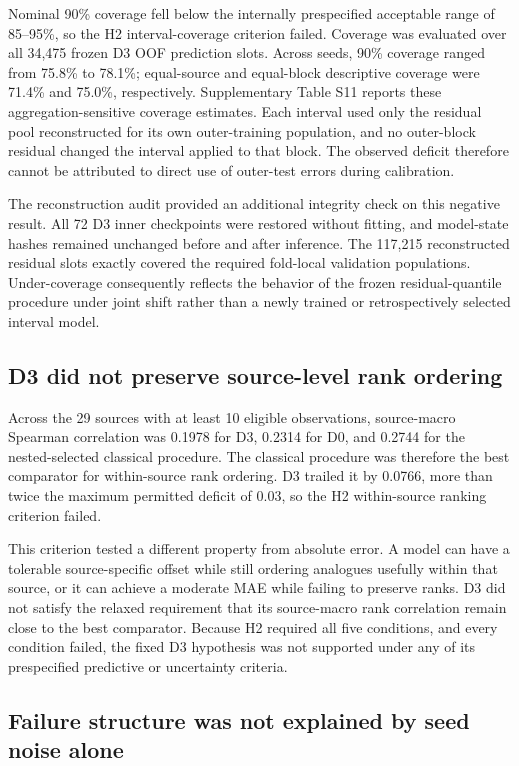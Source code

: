 \documentclass[referee,lineno,pdflatex,sn-vancouver-num]{sn-jnl}
\begin{document}
Nominal 90\% coverage fell below the internally prespecified acceptable range of 85--95\%, so the H2 interval-coverage criterion failed. Coverage was evaluated over all 34,475 frozen D3 OOF prediction slots. Across seeds, 90\% coverage ranged from 75.8\% to 78.1\%; equal-source and equal-block descriptive coverage were 71.4\% and 75.0\%, respectively. Supplementary Table S11 reports these aggregation-sensitive coverage estimates. Each interval used only the residual pool reconstructed for its own outer-training population, and no outer-block residual changed the interval applied to that block. The observed deficit therefore cannot be attributed to direct use of outer-test errors during calibration.

The reconstruction audit provided an additional integrity check on this negative result. All 72 D3 inner checkpoints were restored without fitting, and model-state hashes remained unchanged before and after inference. The 117,215 reconstructed residual slots exactly covered the required fold-local validation populations. Under-coverage consequently reflects the behavior of the frozen residual-quantile procedure under joint shift rather than a newly trained or retrospectively selected interval model.

\subsection{D3 did not preserve source-level rank ordering}

Across the 29 sources with at least 10 eligible observations, source-macro Spearman correlation was 0.1978 for D3, 0.2314 for D0, and 0.2744 for the nested-selected classical procedure. The classical procedure was therefore the best comparator for within-source rank ordering. D3 trailed it by 0.0766, more than twice the maximum permitted deficit of 0.03, so the H2 within-source ranking criterion failed.

This criterion tested a different property from absolute error. A model can have a tolerable source-specific offset while still ordering analogues usefully within that source, or it can achieve a moderate MAE while failing to preserve ranks. D3 did not satisfy the relaxed requirement that its source-macro rank correlation remain close to the best comparator. Because H2 required all five conditions, and every condition failed, the fixed D3 hypothesis was not supported under any of its prespecified predictive or uncertainty criteria.

\subsection{Failure structure was not explained by seed noise alone}
\end{document}
